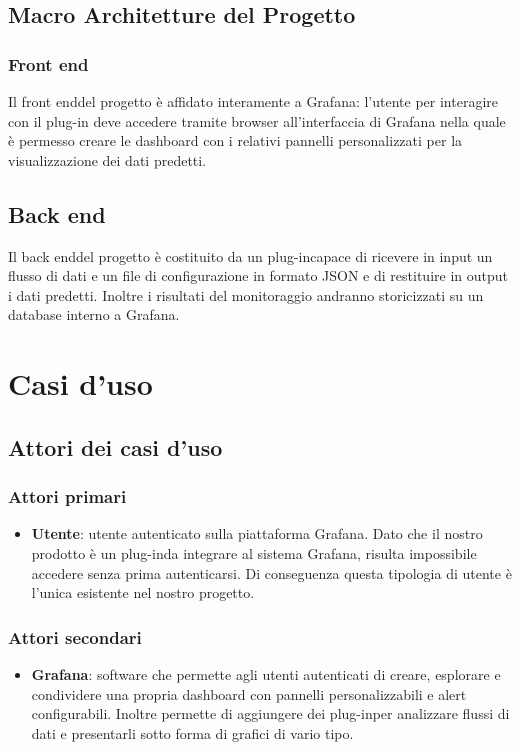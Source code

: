 	\subsection{Macro Architetture del Progetto}
		\subsubsection{Front end}
		Il front end\glosp del progetto è affidato interamente a Grafana: l'utente per interagire con il plug-in deve accedere tramite browser all'interfaccia di Grafana nella quale è permesso creare le dashboard con i relativi pannelli personalizzati per la visualizzazione dei dati predetti. 
		\subsection{Back end}
		Il back end\glosp del progetto è costituito da un plug-in\glosp capace di ricevere in input un flusso di dati e un file di configurazione in formato JSON e di restituire in output i dati predetti. Inoltre i risultati del monitoraggio andranno storicizzati su un database interno a Grafana.
\section{Casi d'uso}
	\subsection{Attori dei casi d'uso}
		\subsubsection{Attori primari}
		\begin{itemize}
			\item \textbf{Utente}: utente autenticato sulla piattaforma Grafana. Dato che il nostro prodotto è un plug-in\glosp da integrare al sistema Grafana, risulta impossibile accedere senza prima autenticarsi. Di conseguenza questa tipologia di utente è l'unica esistente nel nostro progetto.
		\end{itemize}
		\subsubsection{Attori secondari}
		\begin{itemize}
			\item \textbf{Grafana}: software che permette agli utenti autenticati di creare, esplorare e condividere una propria dashboard con pannelli personalizzabili e alert configurabili. Inoltre permette di aggiungere dei plug-in\glosp per analizzare flussi di dati e presentarli sotto forma di grafici di vario tipo.
		\end{itemize}